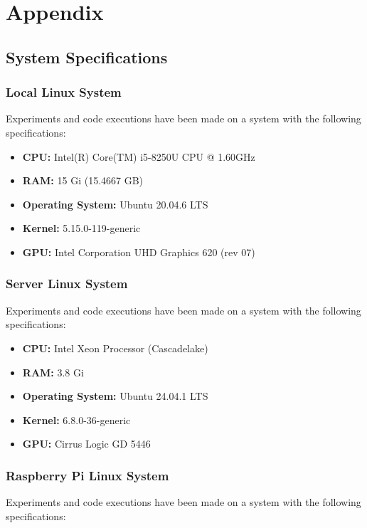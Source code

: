 \chapter{Appendix}
\label{ch:appendix}

\section{System Specifications}

\subsection{Local Linux System}
\label{app:system:mymachine}
Experiments and code executions have been made on a system with the following specifications:

\begin{itemize}
    \item \textbf{CPU:} Intel(R) Core(TM) i5-8250U CPU @ 1.60GHz
    \item \textbf{RAM:} 15 Gi (15.4667 GB)
    \item \textbf{Operating System:} Ubuntu 20.04.6 LTS
    \item \textbf{Kernel:} 5.15.0-119-generic
    \item \textbf{GPU:} Intel Corporation UHD Graphics 620 (rev 07)
\end{itemize}

\subsection{Server Linux System}
\label{app:system:server}
Experiments and code executions have been made on a system with the following specifications:

\begin{itemize}
    \item \textbf{CPU:} Intel Xeon Processor (Cascadelake)
    \item \textbf{RAM:} 3.8 Gi
    \item \textbf{Operating System:} Ubuntu 24.04.1 LTS
    \item \textbf{Kernel:} 6.8.0-36-generic
    \item \textbf{GPU:} Cirrus Logic GD 5446
\end{itemize}

\subsection{Raspberry Pi Linux System}
\label{app:system:pi}
Experiments and code executions have been made on a system with the following specifications:

